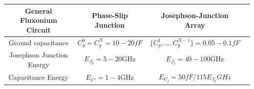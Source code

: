 \documentclass[prx,showpacs,notitlepage,twocolumn,superscriptaddress,nofootinbib,preprintnumbers,floatfix]{revtex4-2}
\begin{document}
\begin{table}[htb]
\begin{center}
\begin{tabular}{|c |c| c |c| }
 \hline
 \textbf{General Fluxonium Circuit} & \textbf{Phase-Slip Junction} & \textbf{Josephson-Junction Array}\\ 
 \hline
 Ground capacitance &$C_g^0=C_g^{N}= 10-20fF$ & $\{C_g^1,...,C_g^{N-1} \}= 0.05-0.1fF$\\ 
 \hline
 Josephson Junction Energy & $E_{J_p}=5-20$GHz & $E_{J_j}=40-100$GHz\\ 
 \hline
 Capacitance Energy &$E_{C'}=1-4$GHz&$E_{C_j}=50fF/115 E_{J_p} GHz$\\
 \hline
\end{tabular}
\end{center}


\end{table}
\end{document}
